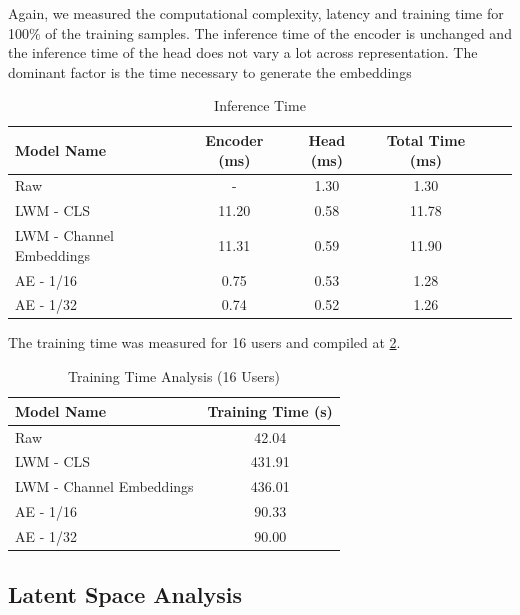 Again, we measured the computational complexity, latency and training time for 100\% of  the training samples. The inference time of the encoder is unchanged and the inference time of the head does not vary a lot across representation. The dominant factor is the time necessary to generate the embeddings

\begin{table}[htbp]
    \centering
    \caption{Inference Time}
    \label{tab:latency_analysis_power}
    \begin{tabular}{lccccc}
        \hline
        \textbf{Model Name} & \textbf{Encoder (ms)} & \textbf{Head (ms)} & \textbf{Total Time (ms)} \\
        \hline
        Raw & - & 1.30 & 1.30 \\
        LWM - CLS & 11.20 & 0.58 & 11.78 \\
        LWM - Channel Embeddings & 11.31 & 0.59 & 11.90 \\
        AE - 1/16 & 0.75 & 0.53 & 1.28 \\
        AE - 1/32 & 0.74 & 0.52 & 1.26 \\
        \hline
    \end{tabular}
\end{table}

The training time was measured for 16 users and compiled at \ref{tab:training_analysis_power}.

\begin{table}[htbp]
    \centering
    \caption{Training Time Analysis (16 Users)}
    \label{tab:training_analysis_power}
    \begin{tabular}{lc}
        \hline
        \textbf{Model Name} & \textbf{Training Time (s)} \\
        \hline
        Raw & 42.04 \\
        LWM - CLS & 431.91 \\
        LWM - Channel Embeddings & 436.01 \\
        AE - 1/16 & 90.33 \\
        AE - 1/32 & 90.00 \\
        \hline
    \end{tabular}
\end{table}

\subsection{Latent Space Analysis}\label{sec:experiments_power_latent}

